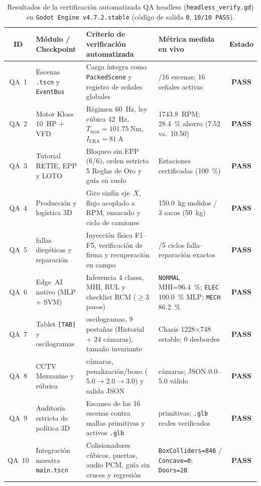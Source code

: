 \begin{table}[!t]
\begingroup
\setlength{\tabcolsep}{3.4pt}
\renewcommand{\arraystretch}{1.04}
\centering\footnotesize
\caption{Resultados de la certificación automatizada QA headless (\texttt{headless\_verify.gd}) en \texttt{Godot Engine v4.7.2.stable} (código de salida \texttt{0}, \texttt{10/10 PASS}).}
\label{tab:qa_headless}
\begin{tabularx}{\textwidth}{@{} c >{\raggedright\arraybackslash}p{3.4cm} >{\raggedright\arraybackslash}X >{\raggedright\arraybackslash}p{4.35cm} c @{}}
\toprule
\textbf{ID} & \textbf{Módulo / Checkpoint} & \textbf{Criterio de verificación automatizada} & \textbf{Métrica medida en vivo} & \textbf{Estado} \\
\midrule
QA~1 & Escenas \texttt{.tscn} y \texttt{EventBus} & Carga íntegra como \texttt{PackedScene} y registro de señales globales & 16/16 escenas; 16 señales activas & \textbf{PASS} \\
QA~2 & Motor Kloss \qty{10}{HP} + VFD & Régimen \qty{60}{\hertz}, ley cúbica \qty{42}{\hertz}, $T_{\max}=\qty{101.75}{\newton\meter}$, $I_{\text{LRA}}=\qty{81}{\ampere}$ & \qty{1743.8}{RPM}; \qty{28.4}{\percent} ahorro (\num{7.52} vs.\ \num{10.50}) & \textbf{PASS} \\
QA~3 & Tutorial RETIE, EPP y LOTO & Bloqueo sin EPP (6/6), orden estricto 5 Reglas de Oro y guía en suelo & 20 Estaciones certificadas (\qty{100}{\percent}) & \textbf{PASS} \\
QA~4 & Producción y logística 3D & Giro sinfín eje~$X$, flujo acoplado a RPM, ensacado y ciclo de camiones & \qty{150.0}{\kilogram} molidos / 3 sacos (\qty{50}{\kilogram}) & \textbf{PASS} \\
QA~5 & 5 fallas diegéticas y reparación & Inyección física F1--F5, verificación de firma y recuperación en campo & 5/5 ciclos falla--reparación exactos & \textbf{PASS} \\
QA~6 & Edge~AI nativo (MLP + SVM) & Inferencia 4 clases, MHI, RUL y checklist RCM ($\ge 3$ pasos) & \texttt{NORMAL} MHI=\qty{96.4}{\percent}; \texttt{ELEC} \qty{100.0}{\percent} MLP; \texttt{MECH} \qty{86.2}{\percent} & \textbf{PASS} \\
QA~7 & Tablet \texttt{[TAB]} y oscilogramas & 3 oscilogramas, 9 pestañas (Historial + 24 cámaras), tamaño invariante & Chasis \num{1228}$\times$\num{748} estable; 0 desbordes & \textbf{PASS} \\
QA~8 & CCTV Mezzanine y rúbrica & 4 cámaras, penalización/bono ($5.0\to 2.0\to 3.0$) y salida JSON & 4 cámaras; JSON 0.0--5.0 válido & \textbf{PASS} \\
QA~9 & Auditoría estricta de política 3D & Escaneo de las 16 escenas contra mallas primitivas y activos \texttt{.glb} & 0 primitivas; \texttt{.glb} reales verificados & \textbf{PASS} \\
QA~10 & Integración maestra \texttt{main.tscn} & Colisionadores cúbicos, puertas, audio PCM, guía sin cruces y regresión & \texttt{BoxColliders=846} / \texttt{Concave=0}; \texttt{Doors=28} & \textbf{PASS} \\
\bottomrule
\end{tabularx}
\endgroup
\end{table}

